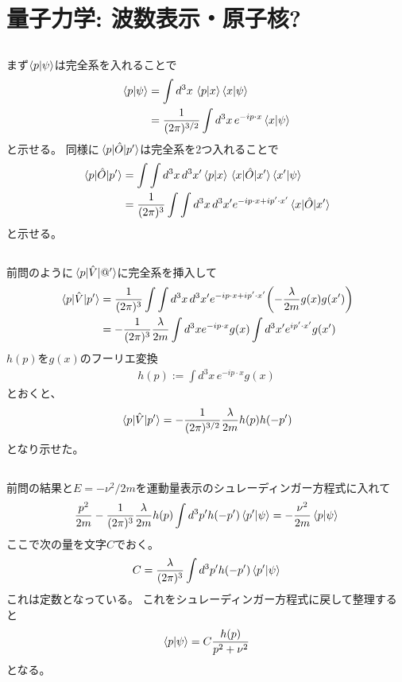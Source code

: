 \documentclass[../../master.tex]{subfiles}
\begin{document}
\section{量子力学: 波数表示・原子核?}
\subsection{}
まず\(\braket{p}{\psi}\)は完全系を入れることで
\begin{align}
    \braket{p}{\psi}
    &=\int d^3x\, \braket{p}{x}\braket{x}{\psi}\\
    &=\frac{1}{(2\pi)^{3/2}}\int d^3x\, e^{-ip\cdot x}\bra{x}\ket{\psi}
\end{align}
と示せる。
同様に\(\mel{p}{\hat{O}}{p'}\)は完全系を2つ入れることで
\begin{align}
    \mel{p}{\hat{O}}{p'}
    &= \int \int d^3x\,d^3x' \braket{p}{x}\mel{x}{\hat{O}}{x'}\braket{x'}{\psi}\\
    &= \frac{1}{(2\pi)^3}\int \int d^3x\,d^3x' e^{-ip\cdot x + ip'\cdot x'}\mel{x}{\hat{O}}{x'}
\end{align}
と示せる。

\subsection{}
前問のように\(\mel{p}{\hat{V}}{@'}\)に完全系を挿入して
\begin{align}
    \mel{p}{\hat{V}}{p'}
    &= \frac{1}{(2\pi)^3}\int \int d^3x\,d^3x' e^{-ip\cdot x + ip'\cdot x'}\qty(-\frac{\lambda}{2m}g(x)g(x'))\\
    &= -\frac{1}{(2\pi)^3}\frac{\lambda}{2m}\int d^3x e^{-ip\cdot x}g(x) \int d^3x' e^{ip'\cdot x'} g(x')
\end{align}
\(h(p)\)を\(g(x)\)のフーリエ変換
\begin{align}
    h(p) := \int d^3x\, e^{-ip\cdot x}g(x)
\end{align}
とおくと、
\begin{align}
    \mel{p}{\hat{V}}{p'} = -\frac{1}{(2\pi)^{3/2}}\frac{\lambda}{2m}h(p)h(-p')
\end{align}
となり示せた。

\subsection{}
前問の結果と\(E=-\nu^2/2m\)を運動量表示のシュレーディンガー方程式に入れて
\begin{align}
    \frac{p^2}{2m}-\frac{1}{(2\pi)^3}\frac{\lambda}{2m}h(p)
        \int d^3p' h(-p')\braket{p'}{\psi}
    = -\frac{\nu^2}{2m}\braket{p}{\psi}
\end{align}
ここで次の量を文字\(C\)でおく。
\begin{align}
    C = \frac{\lambda}{(2\pi)^3}\int d^3p' h(-p')\braket{p'}{\psi}
\end{align}
これは定数となっている。
これをシュレーディンガー方程式に戻して整理すると
\begin{align}
    \braket{p}{\psi} = C\frac{h(p)}{p^2+\nu^2}
\end{align}
となる。
\end{document}
